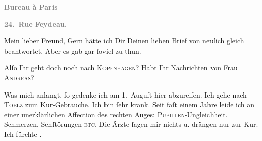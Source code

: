 \pstart
           \begin{otherlanguage}{french}\textcolor{gray}{\textbf{\textbf{Bureau à Paris}}}\end{otherlanguage}\pend
           
\pstart
           \begin{otherlanguage}{french}\textcolor{gray}{\textbf{\textbf{24. Rue Feydeau.}}}\end{otherlanguage}\pend
           
\pstart\center{}Mein lieber Freund,\pend\vspace{0.5em}
\pstart
           Gern hätte ich Dir Deinen lieben Brief von neulich gleich beantwortet. Aber es gab
               gar ſoviel zu thun.\pend
           
\pstart
           Alſo Ihr geht doch noch nach \textsc{Kopenhagen}? Habt Ihr Nachrichten von Frau \textsc{Andreas}?\pend
           
\pstart
           Was mich anlangt, ſo gedenke ich am 1. Auguſt hier
               abzureiſen. Ich gehe nach \textsc{Toelz} zum Kur-Gebrauche. Ich bin ſehr krank. Seit faſt einem Jahre leide ich an einer
               unerklärlichen Affection des rechten Auges: \textsc{Pupillen}-Ungleichheit. Schmerzen, {\pb}Sehſtörungen \textsc{etc}. Die  Ärzte ſagen mir nichts u. drängen nur zur Kur.
               Ich fürchte \label{K_L02741-1v}\label{K_L02741-1}.\pend
           
